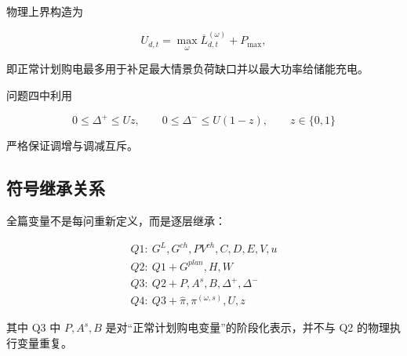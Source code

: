 物理上界构造为

\[
U_{d,t}
=
\max_{\omega}\overline L_{d,t}^{(\omega)}
+
P_{\max},
\]

即正常计划购电最多用于补足最大情景负荷缺口并以最大功率给储能充电。

问题四中利用

\[
0\le\Delta^+\le U z,
\qquad
0\le\Delta^-\le U(1-z),
\qquad
z\in\{0,1\}
\]

严格保证调增与调减互斥。

\subsection{符号继承关系}

全篇变量不是每问重新定义，而是逐层继承：

\[
\boxed{
\begin{array}{l}
Q1:\ G^L,G^{ch},PV^{ch},C,D,E,V,u\\
Q2:\ Q1 + G^{plan},H,W\\
Q3:\ Q2 + P,A^s,B,\Delta^+,\Delta^-\\
Q4:\ Q3 + \hat\pi,\pi^{(\omega,s)},U,z
\end{array}
}
\]

其中 Q3 中 \(P,A^s,B\) 是对“正常计划购电变量”的阶段化表示，并不与 Q2 的物理执行变量重复。
